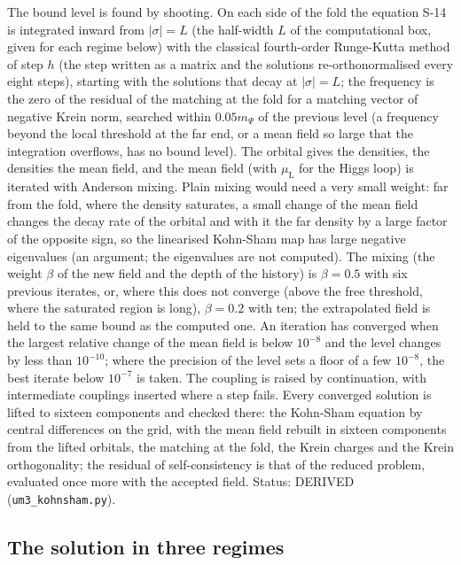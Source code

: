 \documentclass[
  10pt,
]{article}
\begin{document}
The bound level is found by shooting. On each side of the fold the
equation S-14 is integrated inward from \(\lvert\sigma\rvert = L\) (the
half-width \(L\) of the computational box, given for each regime below)
with the classical fourth-order Runge-Kutta method of step \(h\) (the
step written as a matrix and the solutions re-orthonormalised every
eight steps), starting with the solutions that decay at
\(\lvert\sigma\rvert = L\); the frequency is the zero of the residual of
the matching at the fold for a matching vector of negative Krein norm,
searched within \(0.05m_\Psi\) of the previous level (a frequency beyond
the local threshold at the far end, or a mean field so large that the
integration overflows, has no bound level). The orbital gives the
densities, the densities the mean field, and the mean field (with
\(\mu_{\mathrm{L}}\) for the Higgs loop) is iterated with Anderson
mixing. Plain mixing would need a very small weight: far from the fold,
where the density saturates, a small change of the mean field changes
the decay rate of the orbital and with it the far density by a large
factor of the opposite sign, so the linearised Kohn-Sham map has large
negative eigenvalues (an argument; the eigenvalues are not computed).
The mixing (the weight \(\beta\) of the new field and the depth of the
history) is \(\beta = 0.5\) with six previous iterates, or, where this
does not converge (above the free threshold, where the saturated region
is long), \(\beta = 0.2\) with ten; the extrapolated field is held to
the same bound as the computed one. An iteration has converged when the
largest relative change of the mean field is below \(10^{-8}\) and the
level changes by less than \(10^{-10}\); where the precision of the
level sets a floor of a few \(10^{-8}\), the best iterate below
\(10^{-7}\) is taken. The coupling is raised by continuation, with
intermediate couplings inserted where a step fails. Every converged
solution is lifted to sixteen components and checked there: the
Kohn-Sham equation by central differences on the grid, with the mean
field rebuilt in sixteen components from the lifted orbitals, the
matching at the fold, the Krein charges and the Krein orthogonality; the
residual of self-consistency is that of the reduced problem, evaluated
once more with the accepted field. Status: DERIVED
(\texttt{um3\_kohnsham.py}).

\hypertarget{the-solution-in-three-regimes}{%
\subsection{The solution in three
regimes}\label{the-solution-in-three-regimes}}
\end{document}

